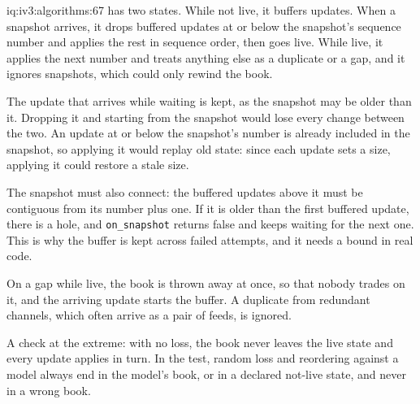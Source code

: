 \begin{solution}{iq:iv3:algorithms:67}
 has two states. While not live, it buffers updates. When a snapshot arrives, it drops buffered updates at or below the snapshot's sequence number and applies the rest in sequence order, then goes live. While live, it applies the next number and treats anything else as a duplicate or a gap, and it ignores snapshots, which could only rewind the book.
\label{lst:iv3:al:snapshot}

The update that arrives while waiting is kept, as the snapshot may be older than it. Dropping it and starting from the snapshot would lose every change between the two. An update at or below the snapshot's number is already included in the snapshot, so applying it would replay old state: since each update sets a size, applying it could restore a stale size.

The snapshot must also connect: the buffered updates above it must be contiguous from its number plus one. If it is older than the first buffered update, there is a hole, and \texttt{on\_snapshot} returns false and keeps waiting for the next one. This is why the buffer is kept across failed attempts, and it needs a bound in real code.

On a gap while live, the book is thrown away at once, so that nobody trades on it, and the arriving update starts the buffer. A duplicate from redundant channels, which often arrive as a pair of feeds, is ignored.

A check at the extreme: with no loss, the book never leaves the live state and every update applies in turn. In the test, random loss and reordering against a model always end in the model's book, or in a declared not-live state, and never in a wrong book.

\end{solution}

